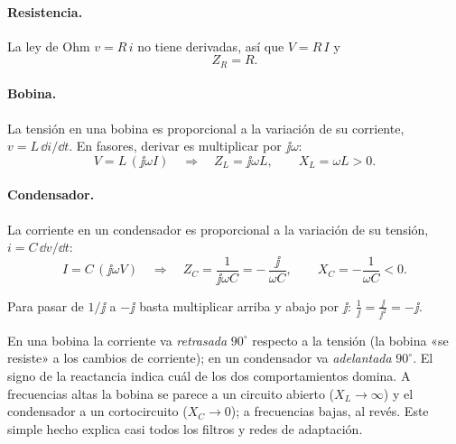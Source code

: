 \paragraph{Resistencia.} La ley de Ohm $v = R\,i$ no tiene derivadas, así que $V = R\,I$ y
\begin{equation} Z_R = R . \end{equation}

\paragraph{Bobina.} La tensión en una bobina es proporcional a la variación de su corriente, $v = L\,\dd i/\dd t$. En fasores,
derivar es multiplicar por $\jj\omega$:
\begin{equation}
  V = L\,(\jj\omega I) \quad\Rightarrow\quad Z_L = \jj\omega L, \qquad X_L = \omega L > 0 .
\end{equation}
\begin{donde}
\end{donde}

\paragraph{Condensador.} La corriente en un condensador es proporcional a la variación de su tensión, $i = C\,\dd v/\dd t$:
\begin{equation}
  I = C\,(\jj\omega V) \quad\Rightarrow\quad Z_C = \frac{1}{\jj\omega C} = -\,\frac{\jj}{\omega C}, \qquad X_C = -\frac{1}{\omega C} < 0 .
\end{equation}
\begin{donde}
\end{donde}
Para pasar de $1/\jj$ a $-\jj$ basta multiplicar arriba y abajo por $\jj$: $\frac{1}{\jj} = \frac{\jj}{\jj^2} = -\jj$.

\begin{intuicion}
En una bobina la corriente va \emph{retrasada} $90^\circ$ respecto a la tensión (la bobina «se resiste» a los cambios de corriente);
en un condensador va \emph{adelantada} $90^\circ$. El signo de la reactancia indica cuál de los dos comportamientos domina.
A frecuencias altas la bobina se parece a un circuito abierto ($X_L\to\infty$) y el condensador a un cortocircuito ($X_C\to 0$);
a frecuencias bajas, al revés. Este simple hecho explica casi todos los filtros y redes de adaptación.
\end{intuicion}

